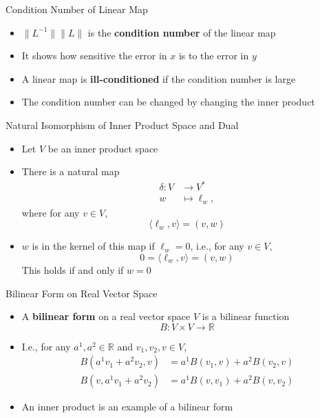 \documentclass[usenames,dvipsnames,10pt]{beamer}
\newcommand{\R}{\mathbb{R}}
\begin{document}
\begin{frame}
  {Condition Number of Linear Map}

  \begin{itemize}
  \item $\|L^{-1}\|\|L\|$ is the {\bf condition number} of the linear map
  \item It shows how sensitive the error in $x$ is to the error in $y$
  \item A linear map is {\bf ill-conditioned} if the condition number is large
  \item The condition number can be changed by changing the inner product
  \end{itemize}
\end{frame}

\begin{frame}
  {Natural Isomorphism of Inner Product Space and Dual}

  \begin{itemize}
  \item Let $V$ be an inner product space
  \item There is a natural map
    \begin{align*}
      \delta: V &\rightarrow V^*\\
      w &\mapsto \ell_w,
    \end{align*}
    where for any $v \in V$,
    \[
      \langle\ell_w,v\rangle = (v,w)
    \]
  \item $w$ is in the kernel of this map if $\ell_w = 0$, i.e., for any $v \in V$,
    \[
      0 = \langle\ell_w,v\rangle = (v,w)
    \]
    This holds if and only if $w = 0$
  \end{itemize}
\end{frame}

\begin{frame}
  {Bilinear Form on Real Vector Space}

  \begin{itemize}
  \item A {\bf bilinear form} on a real vector space $V$ is a bilinear function
    \[ B: V\times V \rightarrow \R \]
  \item I.e., for any $a^1, a^2 \in \R$ and $v_1, v_2, v \in V$,
    \begin{align*}
      B(a^1v_1+a^2v_2,v) &= a^1B(v_1,v)+a^2B(v_2,v)\\
      B(v,a^1v_1+a^2v_2) &= a^1B(v,v_1)+a^2B(v,v_2)
    \end{align*}
  \item An inner product is an example of a bilinear form
  \end{itemize}
\end{frame}
\end{document}
